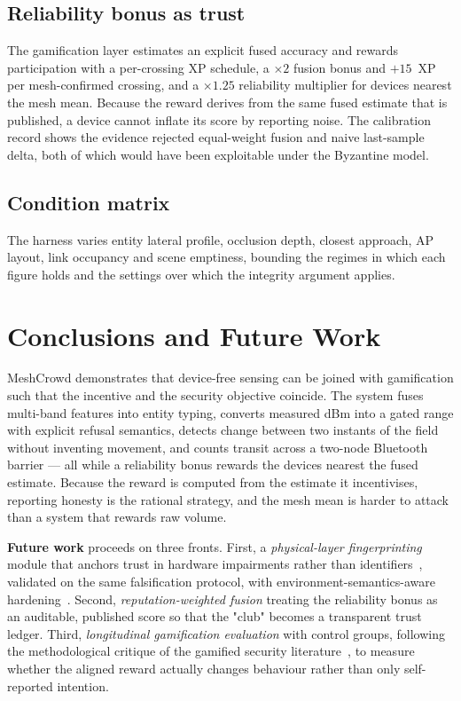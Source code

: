 \documentclass[journal,10pt]{IEEEtran}
\begin{document}
\subsection{Reliability bonus as trust}
The gamification layer estimates an explicit fused accuracy and rewards
participation with a per-crossing XP schedule, a $\times 2$ fusion bonus and
$+15$~XP per mesh-confirmed crossing, and a $\times 1.25$ reliability
multiplier for devices nearest the mesh mean. Because the reward derives from
the same fused estimate that is published, a device cannot inflate its score by
reporting noise. The calibration record shows the evidence rejected equal-weight
fusion and naive last-sample delta, both of which would have been exploitable
under the Byzantine model.

\subsection{Condition matrix}
The harness varies entity lateral profile, occlusion depth, closest approach,
AP layout, link occupancy and scene emptiness, bounding the regimes in which
each figure holds and the settings over which the integrity argument applies.

\section{Conclusions and Future Work}
MeshCrowd demonstrates that device-free sensing can be joined with
gamification such that the incentive and the security objective coincide. The
system fuses multi-band features into entity typing, converts measured dBm into
a gated range with explicit refusal semantics, detects change between two
instants of the field without inventing movement, and counts transit across a
two-node Bluetooth barrier --- all while a reliability bonus rewards the devices
nearest the fused estimate. Because the reward is computed from the estimate it
incentivises, reporting honesty is the rational strategy, and the mesh mean is
harder to attack than a system that rewards raw volume.

\textbf{Future work} proceeds on three fronts. First, a \emph{physical-layer
fingerprinting} module that anchors trust in hardware impairments rather than
identifiers~\cite{zhang2025survey,zhang2023wifi,dfa2025}, validated on the same
falsification protocol, with environment-semantics-aware
hardening~\cite{esaNet}. Second, \emph{reputation-weighted fusion} treating the
reliability bonus as an auditable, published score so that the "club" becomes a
transparent trust ledger. Third, \emph{longitudinal gamification evaluation}
with control groups, following the methodological critique of the gamified
security literature~\cite{gwenhure2025}, to measure whether the aligned reward
actually changes behaviour rather than only self-reported intention.
\end{document}
